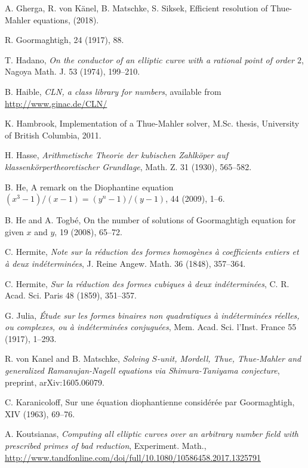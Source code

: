 \begin{thebibliography}{}
A. Gherga, R. von K\"{a}nel, B. Matschke, S. Siksek, 
\newblock Efficient resolution of Thue-Mahler equations, 
 (2018).

R. Goormaghtigh,
 24 (1917), 88.

T. Hadano,
\emph{On the conductor of an elliptic curve with a rational point of order $2$},
Nagoya Math. J. 53 (1974), 199--210.

B. Haible, 
\emph{CLN, a class library for 
numbers}, available from \url{http://www.ginac.de/CLN/}

K. Hambrook,
\newblock Implementation of a Thue-Mahler solver,
\newblock M.Sc. thesis, University of British Columbia, 2011.
	
H. Hasse,
\emph{Arithmetische Theorie der kubischen Zahlk\"{o}per auf klassenk\"{o}rpertheoretischer Grundlage},
Math. Z. 31 (1930), 565--582.

B. He,
\newblock A remark on the Diophantine equation $(x^3-1)/(x-1)=(y^n-1)/(y-1)$,
 44 (2009), 1--6.

B. He and A. Togb\'e,
\newblock On the number of solutions of Goormaghtigh equation for given $x$ and $y$,
 19 (2008), 65--72.

C. Hermite,
\emph{Note sur la r\'eduction des formes homog\`enes \`a 
coefficients entiers et  \`a deux ind\'etermin\'ees},
J. Reine Angew. Math. 36 (1848), 357--364.

C. Hermite,
\emph{Sur la r\'eduction des formes cubiques \`a deux ind\'etermin\'ees},
C. R. Acad. Sci. Paris 48 (1859), 351--357.

G. Julia,
\emph{\'Etude sur les formes binaires non quadratiques \`a ind\'etermin\'ees r\'eelles, ou complexes, ou \`a 
ind\'etermin\'ees conjugu\'ees},
Mem. Acad. Sci. l'Inst. France 55 (1917), 1--293.

R. von Kanel and B. Matschke,
\emph{Solving $S$-unit, Mordell, Thue, Thue-Mahler and generalized Ramanujan-Nagell equations via Shimura-Taniyama conjecture}, 
preprint, arXiv:1605.06079.

C. Karanicoloff,
\newblock Sur une \'equation diophantienne consid\'er\'ee par Goormaghtigh,
 XIV (1963), 69--76.

A. Koutsianas,
\emph{Computing all elliptic curves over an arbitrary number field with prescribed primes of bad reduction}, 
Experiment. Math., \url{http://www.tandfonline.com/doi/full/10.1080/10586458.2017.1325791}


\end{thebibliography}
